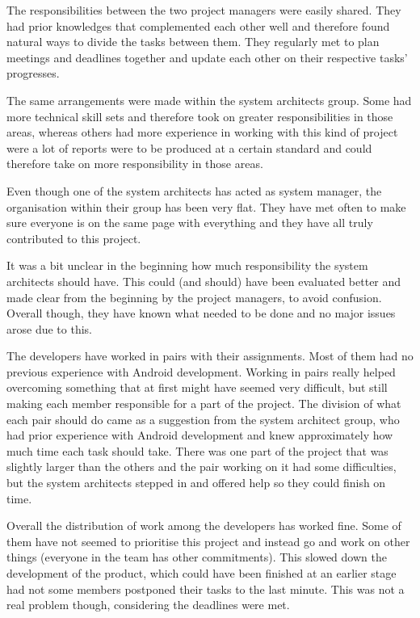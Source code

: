 \documentclass[a4paper]{article}
\begin{document}
The responsibilities between the two project managers were easily shared. They had prior knowledges that complemented each other well and therefore found natural ways to divide the tasks between them. They regularly met to plan meetings and deadlines together and update each other on their respective tasks' progresses. 

The same arrangements were made within the system architects group. Some had more technical skill sets and therefore took on greater responsibilities in those areas, whereas others had more experience in working with this kind of project were a lot of reports were to be produced at a certain standard and could therefore take on more responsibility in those areas. 

Even though one of the system architects has acted as system manager, the organisation within their group has been very flat. They have met often to make sure everyone is on the same page with everything and they have all truly contributed to this project.

It was a bit unclear in the beginning how much responsibility the system architects should have. This could (and should) have been evaluated better and made clear from the beginning by the project managers, to avoid confusion. Overall though, they have known what needed to be done and no major issues arose due to this.

The developers have worked in pairs with their assignments. Most of them had no previous experience with Android development. Working in pairs really helped overcoming something that at first might have seemed very difficult, but still making each member responsible for a part of the project. The division of what each pair should do came as a suggestion from the system architect group, who had prior experience with Android development and knew approximately how much time each task should take. There was one part of the project that was slightly larger than the others and the pair working on it had some difficulties, but the system architects stepped in and offered help so they could finish on time.

Overall the distribution of work among the developers has worked fine. Some of them have not seemed to prioritise this project and instead go and work on other things (everyone in the team has other commitments). This slowed down the development of the product, which could have been finished at an earlier stage had not some members postponed their tasks to the last minute. This was not a real problem though, considering the deadlines were met. 
\end{document}
